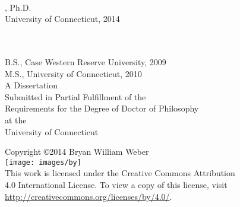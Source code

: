 \documentclass[12pt,letterpaper,oneside,final,openany]{book}
\begin{document}
\pagestyle{abstract}
\thispagestyle{empty}
\begin{center}
\thetitle \\
\theauthor, Ph.D. \\
University of Connecticut, 2014 \\
\blankline
\end{center}


\newpage
\thispagestyle{empty}
\begin{center}
\blankline \blankline
\thetitle \\
\blankline
\theauthor \\
\blankline \blankline
B.S., Case Western Reserve University, 2009 \\
M.S., University of Connecticut, 2010 \\
\blankline \blankline \blankline \blankline \blankline \blankline
\blankline \blankline
A Dissertation \\
Submitted in Partial Fulfillment of the \\
Requirements for the Degree of Doctor of Philosophy \\
at the \\
University of Connecticut \\
\blankline {}
\end{center}
\newpage

\thispagestyle{empty}
\begin{center}
Copyright \copyright 2014 Bryan William Weber \\
\texttt{[image: images/by]} \\
\blankline
This work is licensed under the Creative Commons Attribution\\
4.0 International License. To view a copy of this license, visit\\
\url{http://creativecommons.org/licenses/by/4.0/}.
\blankline \blankline \blankline \blankline \blankline \blankline
\blankline \blankline \blankline \blankline \blankline \blankline
\blankline \blankline \blankline \blankline \blankline \blankline
\blankline {}
\end{center}
\newpage
\end{document}
